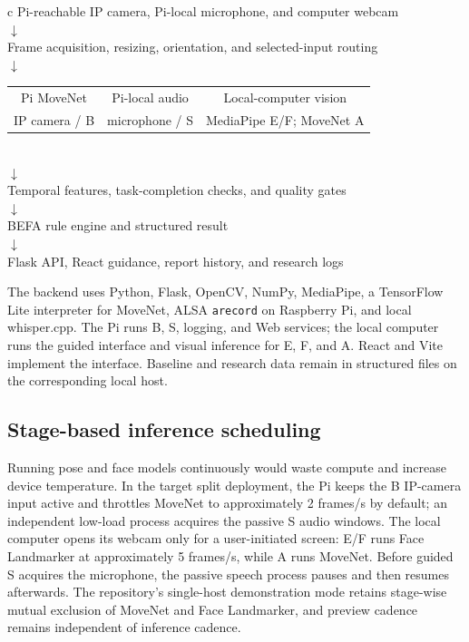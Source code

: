 \documentclass[11pt,a4paper]{article}
\begin{document}
\begin{center}
\begin{tabular}{c}
\toprule
Pi-reachable IP camera, Pi-local microphone, and computer webcam \\
$\downarrow$ \\
Frame acquisition, resizing, orientation, and selected-input routing \\
$\downarrow$ \\
\begin{tabular}{ccc}
Pi MoveNet & Pi-local audio & Local-computer vision \\
IP camera / B & microphone / S & MediaPipe E/F; MoveNet A
\end{tabular} \\
$\downarrow$ \\
Temporal features, task-completion checks, and quality gates \\
$\downarrow$ \\
BEFA rule engine and structured result \\
$\downarrow$ \\
Flask API, React guidance, report history, and research logs \\
\bottomrule
\end{tabular}
\end{center}

The backend uses Python, Flask, OpenCV, NumPy, MediaPipe, a TensorFlow Lite interpreter for MoveNet, ALSA \texttt{arecord} on Raspberry Pi, and local whisper.cpp. The Pi runs B, S, logging, and Web services; the local computer runs the guided interface and visual inference for E, F, and A. React and Vite implement the interface. Baseline and research data remain in structured files on the corresponding local host.

\subsection{Stage-based inference scheduling}

Running pose and face models continuously would waste compute and increase device temperature. In the target split deployment, the Pi keeps the B IP-camera input active and throttles MoveNet to approximately 2 frames/s by default; an independent low-load process acquires the passive S audio windows. The local computer opens its webcam only for a user-initiated screen: E/F runs Face Landmarker at approximately 5 frames/s, while A runs MoveNet. Before guided S acquires the microphone, the passive speech process pauses and then resumes afterwards. The repository's single-host demonstration mode retains stage-wise mutual exclusion of MoveNet and Face Landmarker, and preview cadence remains independent of inference cadence.
\end{document}
